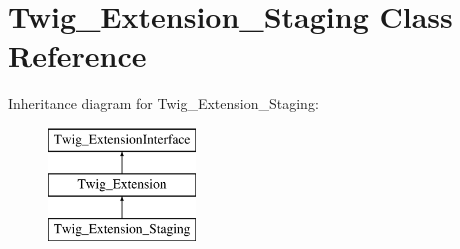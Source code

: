 \hypertarget{classTwig__Extension__Staging}{}\section{Twig\+\_\+\+Extension\+\_\+\+Staging Class Reference}
\label{classTwig__Extension__Staging}
Inheritance diagram for Twig\+\_\+\+Extension\+\_\+\+Staging\+:\begin{figure}[H]
\begin{center}
\leavevmode
\includegraphics[height=3.000000cm]{classTwig__Extension__Staging}
\end{center}
\end{figure}
